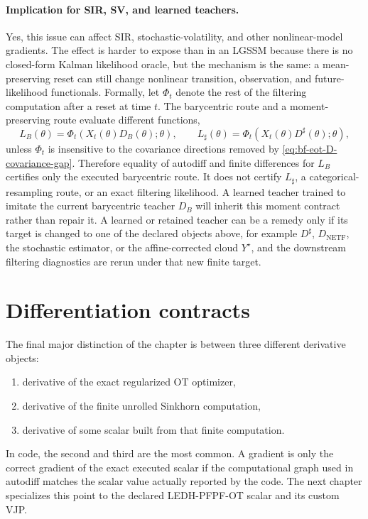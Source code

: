 \paragraph{Implication for SIR, SV, and learned teachers.}
Yes, this issue can affect SIR, stochastic-volatility, and other nonlinear-model
gradients.  The effect is harder to expose than in an LGSSM because there is no
closed-form Kalman likelihood oracle, but the mechanism is the same: a
mean-preserving reset can still change nonlinear transition, observation, and
future-likelihood functionals.  Formally, let \(\Phi_t\) denote the rest of the
filtering computation after a reset at time \(t\).  The barycentric route and a
moment-preserving route evaluate different functions,
\[
  L_B(\theta)=\Phi_t\!\left(X_t(\theta)D_B(\theta);\theta\right),
  \qquad
  L_\sharp(\theta)=
  \Phi_t\!\left(X_t(\theta)D^\sharp(\theta);\theta\right),
\]
unless \(\Phi_t\) is insensitive to the covariance directions removed by
\eqref{eq:bf-eot-D-covariance-gap}.  Therefore equality of autodiff and finite
differences for \(L_B\) certifies only the executed barycentric route.  It does
not certify \(L_\sharp\), a categorical-resampling route, or an exact filtering
likelihood.  A learned teacher trained to imitate the current barycentric teacher
\(D_B\) will inherit this moment contract rather than repair it.  A learned or
retained teacher can be a remedy only if its target is changed to one of the
declared objects above, for example \(D^\sharp\), \(D_{\mathrm{NETF}}\), the
stochastic estimator, or the affine-corrected cloud \(Y^\star\), and the
downstream filtering diagnostics are rerun under that new finite target.

\section{Differentiation contracts}
\label{sec:bf-eot-differentiation}

The final major distinction of the chapter is between three different derivative
objects:
\begin{enumerate}[label=(\roman*)]
  \item derivative of the exact regularized OT optimizer,
  \item derivative of the finite unrolled Sinkhorn computation,
  \item derivative of some scalar built from that finite computation.
\end{enumerate}
In code, the second and third are the most common.  A gradient is only the
correct gradient of the exact executed scalar if the computational graph used in
autodiff matches the scalar value actually reported by the code.  The next chapter
specializes this point to the declared LEDH-PFPF-OT scalar and its custom VJP.

